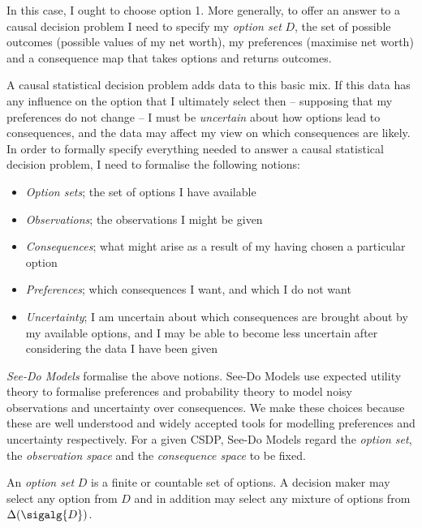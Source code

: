 In this case, I ought to choose option 1. More generally, to offer an answer to a causal decision problem I need to specify my \emph{option set} $D$, the set of possible outcomes (possible values of my net worth), my preferences (maximise net worth) and a consequence map that takes options and returns outcomes.

A causal statistical decision problem adds data to this basic mix. If this data has any influence on the option that I ultimately select then -- supposing that my preferences do not change -- I must be \emph{uncertain} about how options lead to consequences, and the data may affect my view on which consequences are likely. In order to formally specify everything needed to answer a causal statistical decision problem, I need to formalise the following notions:

\begin{itemize}
    \item \emph{Option sets}; the set of options I have available
    \item \emph{Observations}; the observations I might be given
    \item \emph{Consequences}; what might arise as a result of my having chosen a particular option
    \item \emph{Preferences}; which consequences I want, and which I do not want
    \item \emph{Uncertainty}; I am uncertain about which consequences are brought about by my available options, and I may be able to become less uncertain after considering the data I have been given
\end{itemize}

\emph{See-Do Models} formalise the above notions. See-Do Models use expected utility theory to formalise preferences and probability theory to model noisy observations and uncertainty over consequences. We make these choices because these are well understood and widely accepted tools for modelling preferences and uncertainty respectively. For a given CSDP, See-Do Models regard the \emph{option set}, the \emph{observation space} and the \emph{consequence space} to be fixed.

\begin{definition}
An \emph{option set} $D$ is a finite or countable set of options. A decision maker may select any option from $D$ and in addition may select any mixture of options from $\Delta(\sigalg{D})$.
\end{definition}

